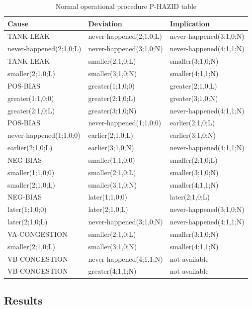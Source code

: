 \documentclass[conference]{IEEEtran}
\begin{document}
\begin{table}
\centering
\begin{tabular}{|l|l|l|}
\hline
Cause & Deviation & Implication \\
\hline
TANK-LEAK & never-happened(2;1,0;L) & never-happened(3;1,0;N) \\
never-happened(2;1,0;L) & never-happened(3;1,0;N) & never-happened(4;1,1;N) \\
TANK-LEAK & smaller(2;1,0;L) & smaller(3;1,0;N) \\
smaller(2;1,0;L) & smaller(3;1,0;N) & smaller(4;1,1;N) \\
POS-BIAS & greater(1;1,0;0) & greater(2;1,0;L) \\
greater(1;1,0;0) & greater(2;1,0;L) & greater(3;1,0;N) \\
greater(2;1,0;L) & greater(3;1,0;N) & never-happened(4;1,1;N) \\
POS-BIAS & never-happened(1;1,0;0) & earlier(2;1,0;L) \\
never-happened(1;1,0;0) & earlier(2;1,0;L) & earlier(3;1,0;N) \\
earlier(2;1,0;L) & earlier(3;1,0;N) & never-happened(4;1,1;N) \\
NEG-BIAS & smaller(1;1,0;0) & smaller(2;1,0;L) \\
smaller(1;1,0;0) & smaller(2;1,0;L) & smaller(3;1,0;N) \\
smaller(2;1,0;L) & smaller(3;1,0;N) & smaller(4;1,1;N) \\
NEG-BIAS & later(1;1,0;0) & later(2;1,0;L) \\
later(1;1,0;0) & later(2;1,0;L) & never-happened(3;1,0;N) \\
later(2;1,0;L) & never-happened(3;1,0;N) & never-happened(4;1,1;N) \\
VA-CONGESTION & smaller(2;1,0;L) & smaller(3;1,0;N) \\
smaller(2;1,0;L) & smaller(3;1,0;N) & smaller(4;1,1;N) \\
VB-CONGESTION & never-happened(4;1,1;N) & not available \\
VB-CONGESTION & greater(4;1,1;N) & not available \\
\hline
\end{tabular}
\caption{Normal operational procedure P-HAZID table}
\label{tab:normalophazid}
\end{table}

\subsection{Results}
\end{document}
